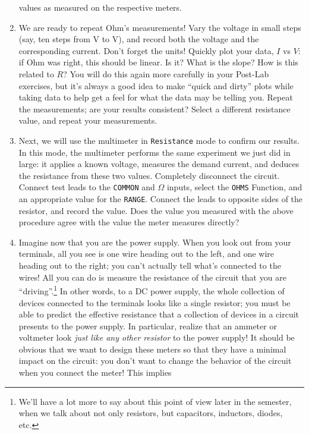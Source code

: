 \documentclass[12pt]{article}
\begin{document}
\begin{enumerate}
  values as measured on the respective meters.
\item We are ready to repeat Ohm's measurements!  Vary the voltage in
  small steps (say, ten steps from \unit[0]{V} to \unit[10]{V}), and
  record both the voltage and the corresponding current.  Don't forget
  the units!  Quickly plot your data, $I$ vs $V$: if Ohm was right,
  this should be linear.  Is it?  What is the slope?  How is this
  related to $R$?  You will do this again more carefully in your
  Post-Lab exercises, but it's always a good idea to make ``quick and
  dirty'' plots while taking data to help get a feel for what the data
  may be telling you.  Repeat the measurements; are your results
  consistent?  Select a different resistance value, and repeat your
  measurements.
\item Next, we will use the multimeter in \texttt{Resistance} mode
  to confirm our results.  In this mode, the multimeter performs the
  same experiment we just did in large: it applies a known voltage,
  measures the demand current, and deduces the resistance from these
  two values.  Completely disconnect the circuit.  Connect test leads
  to the \texttt{COMMON} and \texttt{$\Omega$} inputs, select the
  \texttt{OHMS} Function, and an appropriate value for the
  \texttt{RANGE}.  Connect the leads to opposite sides of the
  resistor, and record the value.  Does the value you measured with
  the above procedure agree with the value the meter measures
  directly?
\item Imagine now that you are the power supply.  When you look out
  from your terminals, all you see is one wire heading out to the
  left, and one wire heading out to the right; you can't actually tell
  what's connected to the wires!  All you can do is measure the
  resistance of the circuit that you are ``driving''.\footnote{We'll
    have a lot more to say about this point of view later in the
    semester, when we talk about not only resistors, but capacitors,
    inductors, diodes, etc.}  In other words, to a DC power supply,
  the whole collection of devices connected to the terminals looks
  like a single resistor; you must be able to predict the effective
  resistance that a collection of devices in a circuit presents to the
  power supply.  In particular, realize that an ammeter or voltmeter
  look \textit{just like any other resistor} to the power supply!  It
  should be obvious that we want to design these meters so that they
  have a minimal impact on the circuit: you don't want to change the
  behavior of the circuit when you connect the meter!  This implies

\end{enumerate}
\end{document}

